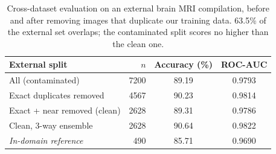 \begin{table}[t]
\centering
\caption{Cross-dataset evaluation on an external brain MRI compilation, before and after removing images that duplicate our training data. 63.5\% of the external set overlaps; the contaminated split scores no higher than the clean one.}
\label{tab:crossdata}
\begin{tabular}{lrcc}
\toprule
External split & $n$ & Accuracy (\%) & ROC-AUC \\
\midrule
All (contaminated) & 7200 & 89.19 & 0.9793 \\
Exact duplicates removed & 4567 & 90.23 & 0.9814 \\
Exact + near removed (clean) & 2628 & 89.31 & 0.9786 \\
Clean, 3-way ensemble & 2628 & 90.64 & 0.9822 \\
\midrule
\textit{In-domain reference} & 490 & 85.71 & 0.9690 \\
\bottomrule
\end{tabular}
\end{table}
